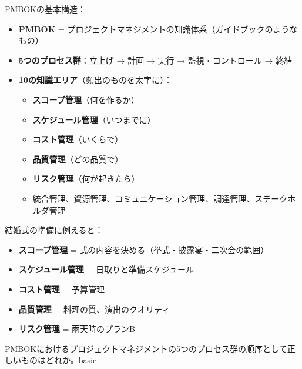 \begin{keypoint}
PMBOKの基本構造：
\begin{itemize}
  \item \textbf{PMBOK} = プロジェクトマネジメントの知識体系（ガイドブックのようなもの）
  \item \textbf{5つのプロセス群}：立上げ → 計画 → 実行 → 監視・コントロール → 終結
  \item \textbf{10の知識エリア}（頻出のものを太字に）：
    \begin{itemize}
      \item \textbf{スコープ管理}（何を作るか）
      \item \textbf{スケジュール管理}（いつまでに）
      \item \textbf{コスト管理}（いくらで）
      \item \textbf{品質管理}（どの品質で）
      \item \textbf{リスク管理}（何が起きたら）
      \item 統合管理、資源管理、コミュニケーション管理、調達管理、ステークホルダ管理
    \end{itemize}
\end{itemize}
\end{keypoint}

\begin{analogy}
結婚式の準備に例えると：
\begin{itemize}
  \item \textbf{スコープ管理} = 式の内容を決める（挙式・披露宴・二次会の範囲）
  \item \textbf{スケジュール管理} = 日取りと準備スケジュール
  \item \textbf{コスト管理} = 予算管理
  \item \textbf{品質管理} = 料理の質、演出のクオリティ
  \item \textbf{リスク管理} = 雨天時のプランB
\end{itemize}
\end{analogy}


\begin{mondai}{PMBOKにおけるプロジェクトマネジメントの5つのプロセス群の順序として正しいものはどれか。}{basic}
\end{mondai}

